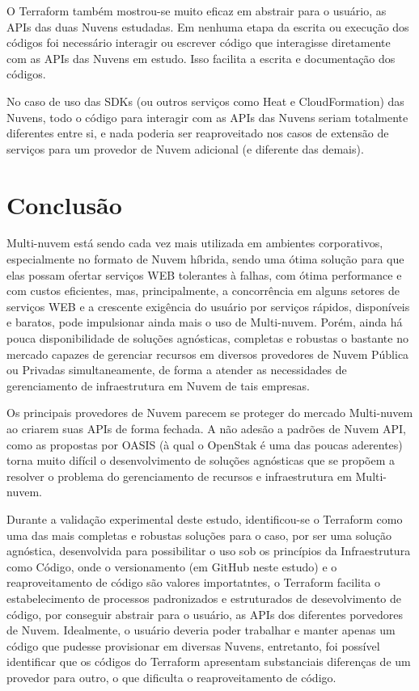 \documentclass[12pt]{article}
\begin{document}
	O Terraform também mostrou-se muito eficaz em abstrair para o usuário, as APIs das duas Nuvens estudadas. Em nenhuma etapa da escrita ou execução dos códigos foi necessário interagir ou escrever código que interagisse diretamente com as APIs das Nuvens em estudo. Isso facilita a escrita e documentação dos códigos.
	
	No caso de uso das SDKs (ou outros serviços como Heat e CloudFormation) das Nuvens, todo o código para interagir com as APIs das Nuvens seriam totalmente diferentes entre si, e nada poderia ser reaproveitado nos casos de extensão de serviços para um provedor de Nuvem adicional (e diferente das demais). 		
	
	\section{Conclusão}
	
	Multi-nuvem está sendo cada vez mais utilizada em ambientes corporativos, especialmente no formato de Nuvem híbrida, sendo uma ótima solução para que elas possam ofertar serviços WEB tolerantes à falhas, com ótima performance e com custos eficientes, mas, principalmente, a concorrência em alguns setores de serviços WEB e a crescente exigência do usuário por serviços rápidos, disponíveis e baratos, pode impulsionar ainda mais o uso de Multi-nuvem. Porém, ainda há pouca disponibilidade de soluções agnósticas, completas e robustas o bastante no mercado capazes de gerenciar recursos em diversos provedores de Nuvem Pública ou Privadas simultaneamente, de forma a atender as necessidades de gerenciamento de infraestrutura em Nuvem de tais empresas.
	
	Os principais provedores de Nuvem parecem se proteger do mercado Multi-nuvem ao criarem suas APIs de forma fechada. A não adesão a padrões de Nuvem API, como as propostas por OASIS \cite{CAMP:2019} (à qual o OpenStak é uma das poucas aderentes) torna muito difícil o desenvolvimento de soluções agnósticas que se propõem a resolver o problema do gerenciamento de recursos e infraestrutura em Multi-nuvem.
		
	Durante a validação experimental deste estudo, identificou-se o Terraform como uma das mais completas e robustas soluções para o caso, por ser uma solução agnóstica, desenvolvida para possibilitar o uso sob os princípios da Infraestrutura como Código, onde o versionamento (em GitHub neste estudo) e o reaproveitamento de código são valores importatntes, o Terraform facilita o estabelecimento de processos padronizados e estruturados de desevolvimento de código, por conseguir abstrair para o usuário, as APIs dos diferentes porvedores de Nuvem. Idealmente, o usuário deveria poder trabalhar e manter apenas um código que pudesse provisionar em diversas Nuvens, entretanto, foi possível identificar que os códigos do Terraform apresentam substanciais diferenças de um provedor para outro, o que dificulta o reaproveitamento de código. 
	
\end{document}
